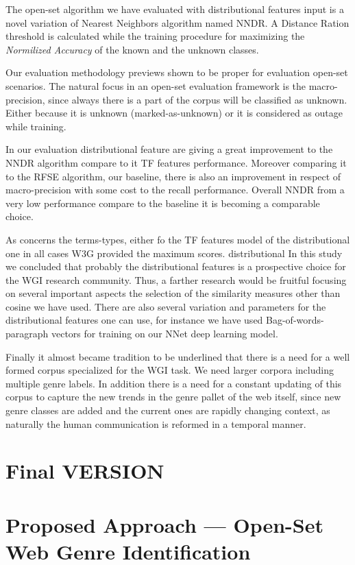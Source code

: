 The open-set algorithm we have evaluated with distributional features input is a novel variation of Nearest Neighbors algorithm named NNDR. A Distance Ration threshold is calculated while the training procedure for maximizing the \textit{Normilized Accuracy} of the known and the unknown classes.

Our evaluation methodology previews shown to be proper for evaluation open-set scenarios. The natural focus in an open-set evaluation framework is the macro-precision, since always there is a part of the corpus will be classified as unknown. Either because it is unknown (marked-as-unknown) or it is considered as outage while training.

In our evaluation distributional feature are giving a great improvement to the NNDR algorithm compare to it TF features performance. Moreover comparing it to the RFSE algorithm, our baseline, there is also an improvement in respect of macro-precision with some cost to the recall performance. Overall NNDR from a very low performance compare to the baseline it is becoming a comparable choice.

As concerns the terms-types, either fo the TF features model of the distributional one in all cases W3G provided the maximum scores.
distributional
In this study we concluded that probably the distributional features is a prospective choice for the WGI research community. Thus, a farther research would be fruitful focusing on several important aspects the selection of the similarity measures other than cosine we have used. There are also several variation and parameters for the distributional features one can use, for instance we have used Bag-of-words-paragraph vectors for training on our NNet deep learning model.

Finally it almost became tradition to be underlined that there is a need for a well formed corpus specialized for the WGI task. We need larger corpora including multiple genre labels. In addition there is a need for a constant updating of this corpus to capture the new trends in the genre pallet of the web itself, since new genre classes are added and the current ones are rapidly changing context, as naturally the human communication is reformed in a temporal manner.


\section{Final VERSION}

\section{Proposed Approach --- Open-Set Web Genre Identification}~\label{sec:approach}


